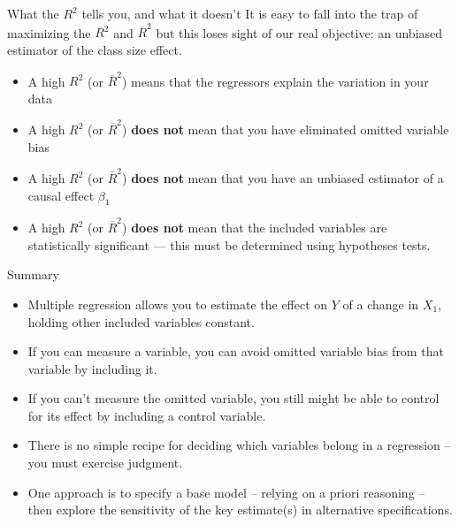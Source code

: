 \documentclass[notes,10pt, aspectratio=169]{beamer}
\begin{document}
\begin{frame}{What the $R^2$ tells you, and what it doesn't }
It is easy to fall into the trap of maximizing the $R^2$ and $\overline{R}^2$ but this loses sight of our real objective: an unbiased estimator of the class size effect.\\[1em]
\begin{itemize}
    \item A high $R^2$ (or $\overline{R}^2$) means that the regressors explain the variation in your data\\[1em]
    \item A high $R^2$ (or $\overline{R}^2$) \textbf{does not} mean that you have eliminated omitted variable bias
    \item A high $R^2$ (or $\overline{R}^2$) \textbf{does not} mean that you have an unbiased estimator of a causal effect $\beta_1$
    \item A high $R^2$ (or $\overline{R}^2$) \textbf{does not} mean that the included variables are statistically significant --- this must be determined using hypotheses tests.
\end{itemize}
\end{frame}

\begin{frame}{Summary}
\begin{itemize}
    \item Multiple regression allows you to estimate the effect on $Y$ of a change in $X_1$, holding other included variables constant.\\[1em]
    \item If you can measure a variable, you can avoid omitted variable bias from that variable by including it.\\[1em]
    \item If you can’t measure the omitted variable, you still might be able to control for its effect by including a control variable.\\[1em]
    \item There is no simple recipe for deciding which variables belong in a regression -- you must exercise judgment.\\[1em]
    \item One approach is to specify a base model -- relying on a priori reasoning -- then explore the sensitivity of the key estimate(s) in alternative specifications.
\end{itemize}

\end{frame}
\end{document}
